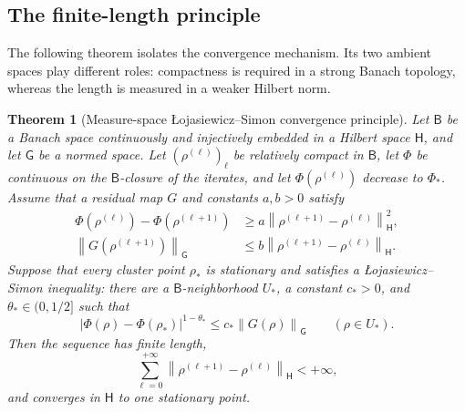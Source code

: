 \documentclass[11pt]{article}
\newtheorem{theorem}{Theorem}[section]
\theoremstyle{definition}
\theoremstyle{remark}
\newcommand{\norm}[1]{\left\lVert #1\right\rVert}
\begin{document}
\subsection{The finite-length principle}

The following theorem isolates the convergence mechanism.  Its two ambient
spaces play different roles: compactness is required in a strong Banach
topology, whereas the length is measured in a weaker Hilbert norm.

\begin{theorem}[Measure-space {\L}ojasiewicz--Simon convergence principle]
\label{thm:measure-ls-convergence-principle}
Let \(\mathsf B\) be a Banach space continuously and injectively embedded
in a Hilbert space \(\mathsf H\), and let \(\mathsf G\) be a normed space.
Let \((\rho^{(\ell)})_\ell\) be relatively compact in \(\mathsf B\), let
\(\Phi\) be continuous on the \(\mathsf B\)-closure of the iterates, and
let \(\Phi(\rho^{(\ell)})\) decrease to \(\Phi_*\).  Assume that a residual
map \(G\) and constants \(a,b>0\) satisfy
\begin{align}
 \Phi(\rho^{(\ell)})-\Phi(\rho^{(\ell+1)})
 &\geq
 a\norm{\rho^{(\ell+1)}-\rho^{(\ell)}}_{\mathsf H}^2,
 \label{eq:abstract-sufficient-decrease}\\
 \norm{G(\rho^{(\ell+1)})}_{\mathsf G}
 &\leq
 b\norm{\rho^{(\ell+1)}-\rho^{(\ell)}}_{\mathsf H}.
 \label{eq:abstract-relative-error}
\end{align}
Suppose that every cluster point \(\rho_*\) is stationary and satisfies a
{\L}ojasiewicz--Simon inequality: there are a \(\mathsf B\)-neighborhood
\(U_*\), a constant \(c_*>0\), and \(\theta_*\in(0,1/2]\) such that
\begin{equation}\label{eq:lojasiewicz-simon-density}
 \left|\Phi(\rho)-\Phi(\rho_*)\right|^{1-\theta_*}
 \leq
 c_*\norm{G(\rho)}_{\mathsf G}
 \qquad(\rho\in U_*).
\end{equation}
Then the sequence has finite length,
\begin{equation}\label{eq:measure-finite-length}
 \sum_{\ell=0}^{+\infty}
 \norm{\rho^{(\ell+1)}-\rho^{(\ell)}}_{\mathsf H}<+\infty,
\end{equation}
and converges in \(\mathsf H\) to one stationary point.
\end{theorem}
\end{document}
